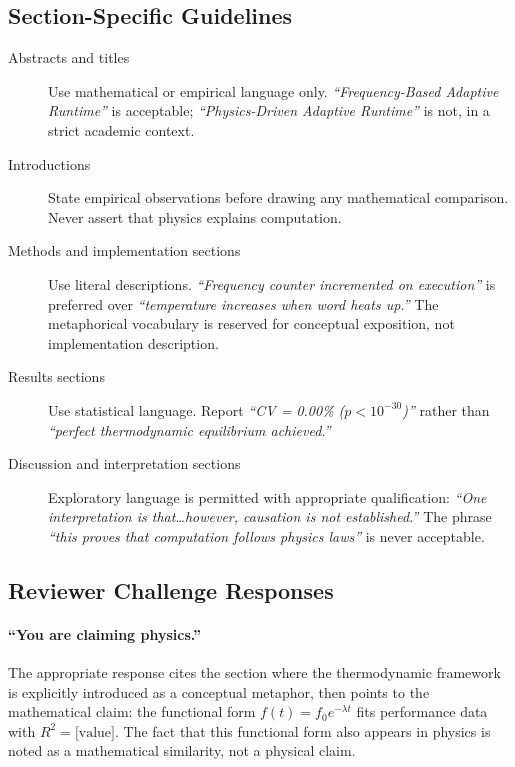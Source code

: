 \subsection{Section-Specific Guidelines}

\begin{description}
  \item[Abstracts and titles] Use mathematical or empirical language only.
    \emph{``Frequency-Based Adaptive Runtime''} is acceptable;
    \emph{``Physics-Driven Adaptive Runtime''} is not, in a strict academic context.

  \item[Introductions] State empirical observations before drawing any
    mathematical comparison. Never assert that physics explains computation.

  \item[Methods and implementation sections] Use literal descriptions.
    \emph{``Frequency counter incremented on execution''} is preferred over
    \emph{``temperature increases when word heats up.''} The metaphorical
    vocabulary is reserved for conceptual exposition, not implementation
    description.

  \item[Results sections] Use statistical language. Report
    \emph{``CV = 0.00\% ($p < 10^{-30}$)''} rather than
    \emph{``perfect thermodynamic equilibrium achieved.''}

  \item[Discussion and interpretation sections] Exploratory language is
    permitted with appropriate qualification: \emph{``One interpretation is
    that\ldots however, causation is not established.''} The phrase
    \emph{``this proves that computation follows physics laws''} is never
    acceptable.
\end{description}

\subsection{Reviewer Challenge Responses}

\paragraph{``You are claiming physics.''}
The appropriate response cites the section where the thermodynamic framework
is explicitly introduced as a conceptual metaphor, then points to the
mathematical claim: the functional form $f(t) = f_0 e^{-\lambda t}$ fits
performance data with $R^2 = \text{[value]}$. The fact that this functional
form also appears in physics is noted as a mathematical similarity, not
a physical claim.


